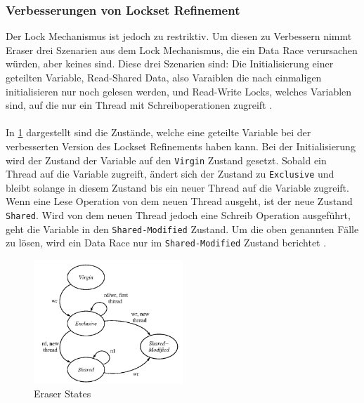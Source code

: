 \subsubsection*{Verbesserungen von Lockset Refinement}

Der Lock Mechanismus ist jedoch zu restriktiv. Um diesen zu Verbessern nimmt Eraser drei Szenarien aus dem Lock Mechanismus, die ein Data Race verursachen würden, aber keines sind. Diese drei Szenarien sind: Die Initialisierung einer geteilten Variable, Read-Shared Data, also Varaiblen die nach einmaligen initialisieren nur noch gelesen werden, und Read-Write Locks, welches Variablen sind, auf die nur ein Thread mit Schreiboperationen zugreift \cite[vgl.][396-397]{savage_eraser_nodate}. \\
\\
In \ref{fig:eraserState} dargestellt sind die Zustände, welche eine geteilte Variable bei der verbesserten Version des Lockset Refinements haben kann. Bei der Initialisierung wird der Zustand der Variable auf den \texttt{Virgin} Zustand gesetzt. Sobald ein Thread auf die Variable zugreift, ändert sich der Zustand zu \texttt{Exclusive} und bleibt solange in diesem Zustand bis ein neuer Thread auf die Variable zugreift. Wenn eine Lese Operation von dem neuen Thread ausgeht, ist der neue Zustand \texttt{Shared}. Wird von dem neuen Thread jedoch eine Schreib Operation ausgeführt, geht die Variable in den \texttt{Shared-Modified} Zustand. Um die oben genannten Fälle zu lösen, wird ein Data Race nur im \texttt{Shared-Modified} Zustand berichtet \cite[vgl.][397-399]{savage_eraser_nodate}.   

\begin{figure}[ht]
    \centering
    \includegraphics[width=0.5\textwidth]{gfx/eraser_state.png}
    \caption{Eraser States \cite[389]{savage_eraser_nodate}}
    \label{fig:eraserState}
\end{figure}


